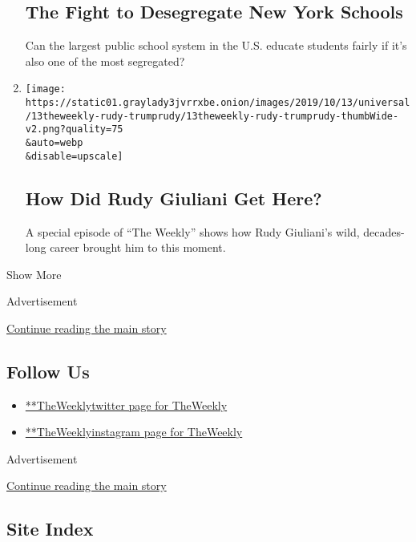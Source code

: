 \begin{enumerate}
  \hypertarget{the-fight-to-desegregate-new-york-schools}{%
  \subsection{The Fight to Desegregate New York
  Schools}\label{the-fight-to-desegregate-new-york-schools}}

  Can the largest public school system in the U.S. educate students
  fairly if it's also one of the most segregated?
\item
  \href{/2019/10/11/the-weekly/rudy-giuliani-trump-ukraine.html}{}

  \texttt{[image: https://static01.graylady3jvrrxbe.onion/images/2019/10/13/universal/13theweekly-rudy-trumprudy/13theweekly-rudy-trumprudy-thumbWide-v2.png?quality=75\\\&auto=webp\\\&disable=upscale]}

  \hypertarget{how-did-rudy-giuliani-get-here}{%
  \subsection{How Did Rudy Giuliani Get
  Here?}\label{how-did-rudy-giuliani-get-here}}

  A special episode of ``The Weekly'' shows how Rudy Giuliani's wild,
  decades-long career brought him to this moment.
\end{enumerate}

Show More

Advertisement

\protect\hyperlink{after-mid2}{Continue reading the main story}

\hypertarget{follow-us}{%
\subsection{Follow Us}\label{follow-us}}

\begin{itemize}
\tightlist
\item
  \href{https://twitter.com/TheWeekly}{**TheWeeklytwitter page for
  TheWeekly}
\item
  \href{https://instagram.com/TheWeekly}{**TheWeeklyinstagram page for
  TheWeekly}
\end{itemize}

Advertisement

\protect\hyperlink{after-mktg}{Continue reading the main story}

\hypertarget{site-index}{%
\subsection{Site Index}\label{site-index}}

